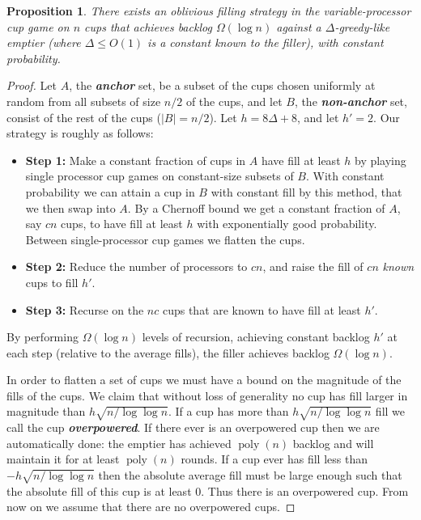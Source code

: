 \documentclass[twocolumn]{article}[10pt]
\newcommand{\defn}[1]{{\textit{\textbf{\boldmath #1}}}\xspace}
\DeclareMathOperator{\poly}{\text{poly}}
\newtheorem{proposition}{Proposition}
\begin{document}
\begin{proposition}
  \label{prop:obliviousBase}
  There exists an oblivious filling strategy in the variable-processor cup game
  on $n$ cups that achieves backlog $\Omega(\log n)$ against a
  $\Delta$-greedy-like emptier (where $\Delta \le O(1)$ is a constant known
  to the filler), with constant probability.
\end{proposition}
\begin{proof}
    Let $A$, the \defn{anchor} set, be a subset of the cups chosen uniformly at
  random from all subsets of size $n/2$ of the cups, and let $B$, the
  \defn{non-anchor} set, consist of the rest of the cups ($|B| = n/2$). Let $h
  = 8\Delta + 8$, and let $h' = 2$. Our strategy is roughly as follows: 
  \begin{itemize}
    \item \textbf{Step 1:} Make a constant fraction of cups in $A$ have fill at
      least $h$ by playing single processor cup games on constant-size subsets
      of $B$. With constant probability we can attain a cup in $B$ with
      constant fill by this method, that we then swap into $A$. By a Chernoff
      bound we get a constant fraction of $A$, say $cn$ cups, to have fill at
      least $h$ with exponentially good probability. Between single-processor
      cup games we flatten the cups.
    \item \textbf{Step 2:} Reduce the number of processors to $cn$, and raise
      the fill of $cn$ \emph{known} cups to fill $h'$. 
    \item \textbf{Step 3:} Recurse on the $nc$ cups that are known to have fill
      at least $h'$.
  \end{itemize}

By performing $\Omega(\log n)$ levels of recursion, achieving constant backlog
$h'$ at each step (relative to the average fills), the filler achieves backlog
$\Omega(\log n)$.

In order to flatten a set of cups we must have a bound on the magnitude of the
fills of the cups. We claim that without loss of generality no cup has fill
larger in magnitude than $h\sqrt{n/\log\log n}$. If a cup has more than
$h\sqrt{n/\log\log n}$ fill we call the cup \defn{overpowered}. If there ever
is an overpowered cup then we are automatically done: the emptier has achieved
$\poly(n)$ backlog and will maintain it for at least $\poly(n)$ rounds. If a
cup ever has fill less than $-h\sqrt{n/\log\log n}$ then the absolute average
fill must be large enough such that the absolute fill of this cup is at least
$0$. Thus there is an overpowered cup. From now on we assume that there are no
overpowered cups.


\end{proof}
\end{document}
